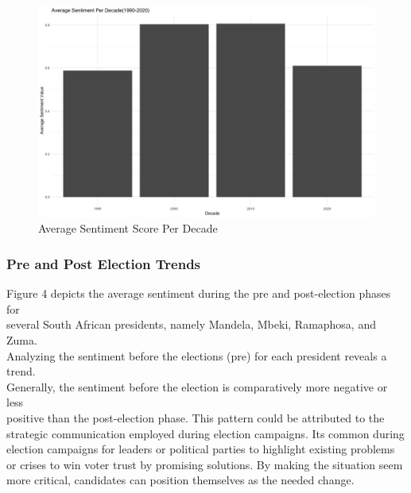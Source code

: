 \documentclass[
  letterpaper,
  DIV=11,
  numbers=noendperiod]{scrartcl}
\begin{document}
\begin{figure}

{\centering \includegraphics{docs/Per_Decade.png}

}

\caption{Average Sentiment Score Per Decade}

\end{figure}

\hypertarget{pre-and-post-election-trends}{%
\subsubsection{Pre and Post Election
Trends}\label{pre-and-post-election-trends}}

Figure 4 depicts the average sentiment during the pre and post-election
phases for\\
several South African presidents, namely Mandela, Mbeki, Ramaphosa, and
Zuma.\\
Analyzing the sentiment before the elections (pre) for each president
reveals a trend.\\
Generally, the sentiment before the election is comparatively more
negative or less\\
positive than the post-election phase. This pattern could be attributed
to the strategic communication employed during election campaigns.
It\textquotesingle s common during election campaigns for leaders or
political parties to highlight existing problems or crises to win voter
trust by promising solutions. By making the situation seem more
critical, candidates can position themselves as the needed change.
\end{document}
